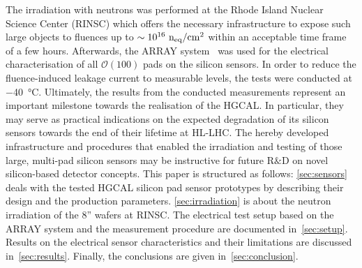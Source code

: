 The irradiation with neutrons was performed at the Rhode Island Nuclear Science Center (RINSC) which offers the necessary infrastructure to expose such large objects to fluences up to  $\sim 10^{16}~\mathrm{n_{eq}}/\mathrm{cm}^{2}$ within an acceptable time frame of a few hours.
Afterwards, the ARRAY system~\cite{pitters:array2019} was used for the electrical characterisation of all $\mathcal{O}(100)$ pads on the silicon sensors.
In order to reduce the fluence-induced leakage current to measurable levels, the tests were conducted at \SI{-40}{\celsius}.
Ultimately, the results from the conducted measurements represent an important milestone towards the realisation of the HGCAL.
In particular, they may serve as practical indications on the expected degradation of its silicon sensors towards the end of their lifetime at HL-LHC. 
The hereby developed infrastructure and procedures that enabled the irradiation and testing of those large, multi-pad silicon sensors may be instructive for future R$\&$D on novel silicon-based detector concepts.\newline
This paper is structured as follows:
\ref{sec:sensors} deals with the tested HGCAL silicon pad sensor prototypes by describing their design and the production parameters.
\ref{sec:irradiation} is about the neutron irradiation of the 8'' wafers at RINSC. 
The electrical test setup based on the ARRAY system and the measurement procedure are documented in~\ref{sec:setup}.
Results on the electrical sensor characteristics and their limitations are discussed in~\ref{sec:results}.
Finally, the conclusions are given in~\ref{sec:conclusion}.